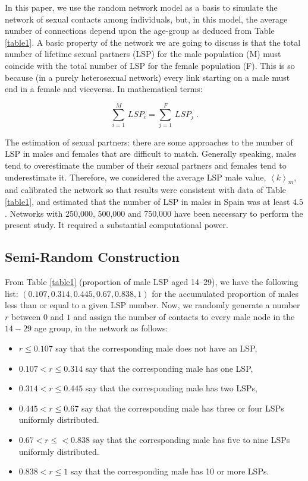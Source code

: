 In this paper, we use the random network model as a basis to simulate the network of sexual contacts among individuals, but, in this model, the average number of connections depend upon the age-group as deduced from Table \ref{table1}. A basic property of the network we are going to discuss is that the total number of lifetime sexual partners (LSP) for the male population (M) must
coincide with the total number of LSP for the female population (F). This is so because (in a purely heterosexual network) every link starting on a male must end in a female and viceversa. In mathematical terms:

\begin{equation}
\label{nodeseq}
\displaystyle\sum_{i=1}^M\, LSP_i=\displaystyle\sum_{j=1}^F\, LSP_j\; .
\end{equation}

The estimation of sexual partners: there are some approaches to the number of LSP in males and females \cite{USA,USA2} that are difficult to match. Generally speaking, males tend to overestimate the number of their sexual partners and females tend to underestimate it. Therefore, we considered the average LSP male value, $\left\langle k \right\rangle_m$, and calibrated the network so that results were consistent with data of Table \ref{table1}, and estimated that the number of LSP in males in Spain was at least $4.5$. Networks with 250,000, 500,000 and 750,000 have been necessary to perform the present study. It required a substantial computational power.

\subsection{Semi-Random Construction}
\label{subsec22}

From Table \ref{table1} (proportion of male LSP aged 14--29), we have the following list:
$( 0.107, 0.314, 0.445, 0.67, 0.838, 1)$ for the accumulated proportion of males less than or equal to a given LSP number.
Now, we randomly generate a number $r$ between $0$ and $1$ and assign the number of contacts to every male node in the $14-29$
age group, in the network as follows:

\begin{itemize}[leftmargin=*,labelsep=5mm]
\item $r \le 0.107$ say that the corresponding male does not have an LSP,
\item $0.107 < r \le 0.314$ say that the corresponding male has one LSP,
\item $0.314 < r \le 0.445$ say that the corresponding male has two LSPs,
\item $0.445 < r \le 0.67$  say that the corresponding male has three or four LSPs uniformly distributed.
\item $0.67 < r \le < 0.838$ say that the corresponding male has five to nine LSPs uniformly distributed.
\item $0.838 < r \le 1$ say that the corresponding male has 10 or more LSPs.
\end{itemize}

